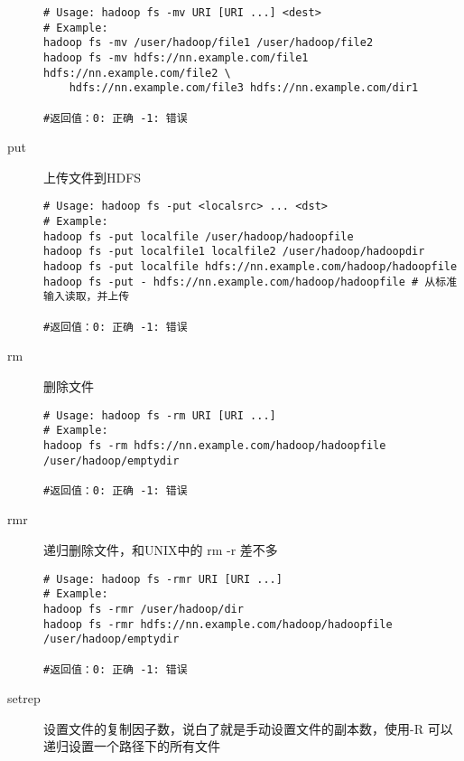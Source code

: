 \documentclass{article}
\begin{document}
\begin{description}
\begin{verbatim}
# Usage: hadoop fs -mv URI [URI ...] <dest>
# Example:
hadoop fs -mv /user/hadoop/file1 /user/hadoop/file2
hadoop fs -mv hdfs://nn.example.com/file1 hdfs://nn.example.com/file2 \
	hdfs://nn.example.com/file3 hdfs://nn.example.com/dir1

#返回值：0: 正确 -1: 错误
\end{verbatim}

\item[put] 上传文件到HDFS

\begin{verbatim}
# Usage: hadoop fs -put <localsrc> ... <dst>
# Example:
hadoop fs -put localfile /user/hadoop/hadoopfile
hadoop fs -put localfile1 localfile2 /user/hadoop/hadoopdir
hadoop fs -put localfile hdfs://nn.example.com/hadoop/hadoopfile
hadoop fs -put - hdfs://nn.example.com/hadoop/hadoopfile # 从标准输入读取，并上传

#返回值：0: 正确 -1: 错误
\end{verbatim}

\item[rm] 删除文件

\begin{verbatim}
# Usage: hadoop fs -rm URI [URI ...]
# Example:
hadoop fs -rm hdfs://nn.example.com/hadoop/hadoopfile /user/hadoop/emptydir

#返回值：0: 正确 -1: 错误
\end{verbatim}

\item[rmr] 递归删除文件，和UNIX中的 rm -r 差不多

\begin{verbatim}
# Usage: hadoop fs -rmr URI [URI ...]
# Example:
hadoop fs -rmr /user/hadoop/dir
hadoop fs -rmr hdfs://nn.example.com/hadoop/hadoopfile /user/hadoop/emptydir

#返回值：0: 正确 -1: 错误
\end{verbatim}

\item[setrep] 设置文件的复制因子数，说白了就是手动设置文件的副本数，使用-R
可以递归设置一个路径下的所有文件


\end{description}
\end{document}
